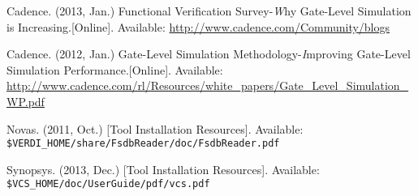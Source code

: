 \begin{thebibliography}{10}
	
%
%
%
%
%
{}
\BIBentryALTinterwordspacing
Cadence. (2013, Jan.) {Functional Verification Survey-{\emph Why Gate-Level Simulation is Increasing}}.[Online]. Available:
\url {http://www.cadence.com/Community/blogs}
\BIBentrySTDinterwordspacing

\BIBentryALTinterwordspacing
Cadence. (2012, Jan.) {Gate-Level Simulation Methodology-{\emph Improving Gate-Level Simulation Performance}}.[Online]. Available:
\url {http://www.cadence.com/rl/Resources/white_papers/Gate_Level_Simulation_WP.pdf}
\BIBentrySTDinterwordspacing


\BIBentryALTinterwordspacing
Novas. (2011, Oct.) [Tool Installation Resources]. Available:
  \verb|$VERDI_HOME/share/FsdbReader/doc/FsdbReader.pdf|
\BIBentrySTDinterwordspacing

\BIBentryALTinterwordspacing
Synopsys. (2013, Dec.) [Tool Installation Resources]. Available:
  \verb|$VCS_HOME/doc/UserGuide/pdf/vcs.pdf|
\BIBentrySTDinterwordspacing


\end{thebibliography}
